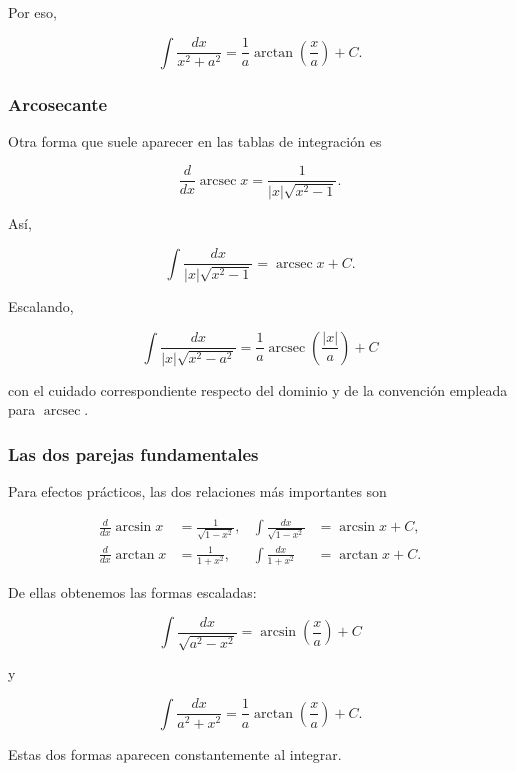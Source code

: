\documentclass[12pt]{article}
\theoremstyle{definition}
\theoremstyle{remark}
\begin{document}
Por eso,

\[
\boxed{
\int\frac{dx}{x^2+a^2}
=
\frac1a\arctan\left(\frac{x}{a}\right)+C.
}
\]

\subsubsection*{Arcosecante}

Otra forma que suele aparecer en las tablas de integración es

\[
\frac{d}{dx}\operatorname{arcsec}x
=
\frac{1}{|x|\sqrt{x^2-1}}.
\]

Así,

\[
\boxed{
\int
\frac{dx}{|x|\sqrt{x^2-1}}
=
\operatorname{arcsec}x+C
}.
\]

Escalando,

\[
\boxed{
\int
\frac{dx}{|x|\sqrt{x^2-a^2}}
=
\frac1a
\operatorname{arcsec}\left(\frac{|x|}{a}\right)+C
}
\]

con el cuidado correspondiente respecto del dominio y de la
convención empleada para \(\operatorname{arcsec}\).

\subsubsection*{Las dos parejas fundamentales}

Para efectos prácticos, las dos relaciones más importantes son

\[
\boxed{
\begin{aligned}
\frac{d}{dx}\arcsin x
&=\frac{1}{\sqrt{1-x^2}},
&
\int\frac{dx}{\sqrt{1-x^2}}
&=\arcsin x+C,
\\[3mm]
\frac{d}{dx}\arctan x
&=\frac{1}{1+x^2},
&
\int\frac{dx}{1+x^2}
&=\arctan x+C.
\end{aligned}}
\]

De ellas obtenemos las formas escaladas:

\[
\boxed{
\int\frac{dx}{\sqrt{a^2-x^2}}
=
\arcsin\left(\frac{x}{a}\right)+C
}
\]

y

\[
\boxed{
\int\frac{dx}{a^2+x^2}
=
\frac1a\arctan\left(\frac{x}{a}\right)+C.
}
\]

Estas dos formas aparecen constantemente al integrar.

\end{document}
